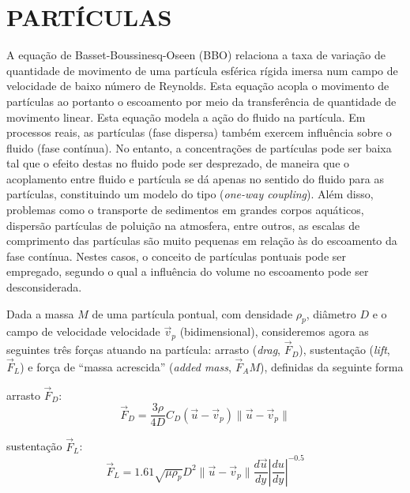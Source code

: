 \typeout{ ====================================================================}
\typeout{ ====================================================================}

\section{PARTÍCULAS}

A equação de Basset-Boussinesq-Oseen (BBO) relaciona a taxa de variação de quantidade de movimento de uma partícula esférica rígida imersa num campo de velocidade de baixo número de Reynolds. Esta equação acopla o movimento de partículas ao portanto o escoamento por meio da transferência de quantidade de movimento linear. Esta equação modela a ação do fluido na partícula. Em processos reais, as partículas (fase dispersa) também exercem influência sobre o fluido (fase contínua). No entanto, a concentrações de partículas pode ser baixa tal que o efeito destas no fluido pode ser desprezado, de maneira que o acoplamento entre fluido e partícula se dá apenas no sentido do fluido para as partículas, constituindo um modelo do tipo ({\it one-way coupling}). Além disso, problemas como o transporte de sedimentos em grandes corpos aquáticos, dispersão partículas de poluição na atmosfera, entre outros, as escalas de comprimento das partículas são muito pequenas em relação às do escoamento da fase contínua. Nestes casos, o conceito de partículas pontuais pode ser empregado, segundo o qual a influência do volume no escoamento pode ser desconsiderada.

Dada a massa $M$ de uma partícula pontual, com densidade $\rho_p$, diâmetro $D$ e o campo de velocidade velocidade $\vec{v}_p$ (bidimensional), consideremos agora as seguintes três forças atuando na partícula: arrasto ({\it drag}, $\vec{F}_D$), sustentação ({\it lift}, $\vec{F}_L$) e força de ``massa acrescida'' ({\it added mass}, $\vec{F}_AM$), definidas da seguinte forma

arrasto $\vec{F}_D$:
\begin{equation}
\vec{F}_D = \frac{3\rho}{4D}C_D(\vec{u}-\vec{v}_p)\parallel\vec{u}-\vec{v}_p\parallel
\label{eq:arrasto}
\end{equation}

sustentação $\vec{F}_L$:
\begin{equation}
\vec{F}_L = 1.61\sqrt{\mu\rho_p}D^2\parallel\vec{u}-\vec{v}_p\parallel\frac{d\vec{u}}{dy}\left|\frac{du}{dy}\right|^{-0.5}
\label{eq:sustentacao}
\end{equation}

